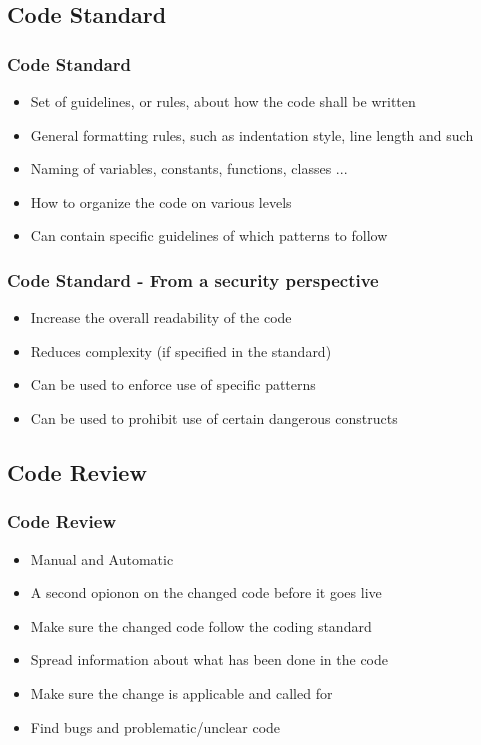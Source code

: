 \documentclass{beamer}
\begin{document}
  \subsection{Code Standard}
    \begin{frame}
      \frametitle{Code Standard}
      \begin{itemize}
        \item Set of guidelines, or rules, about how the code shall be written
        \item General formatting rules, such as indentation style, line length and such
        \item Naming of variables, constants, functions, classes ...
        \item How to organize the code on various levels
        \item Can contain specific guidelines of which patterns to follow
      \end{itemize}
    \end{frame}

    \begin{frame}
      \frametitle{Code Standard - From a security perspective}
      \begin{itemize}
        \item Increase the overall readability of the code
        \item Reduces complexity (if specified in the standard)
        \item Can be used to enforce use of specific patterns
        \item Can be used to prohibit use of certain dangerous constructs
      \end{itemize}
    \end{frame}

    \subsection{Code Review}
    \begin{frame}
      \frametitle{Code Review}
      \begin{itemize}
        \item Manual and Automatic
        \item A second opionon on the changed code before it goes live
        \item Make sure the changed code follow the coding standard
        \item Spread information about what has been done in the code
        \item Make sure the change is applicable and called for
        \item Find bugs and problematic/unclear code
      \end{itemize}
    \end{frame}
\end{document}

